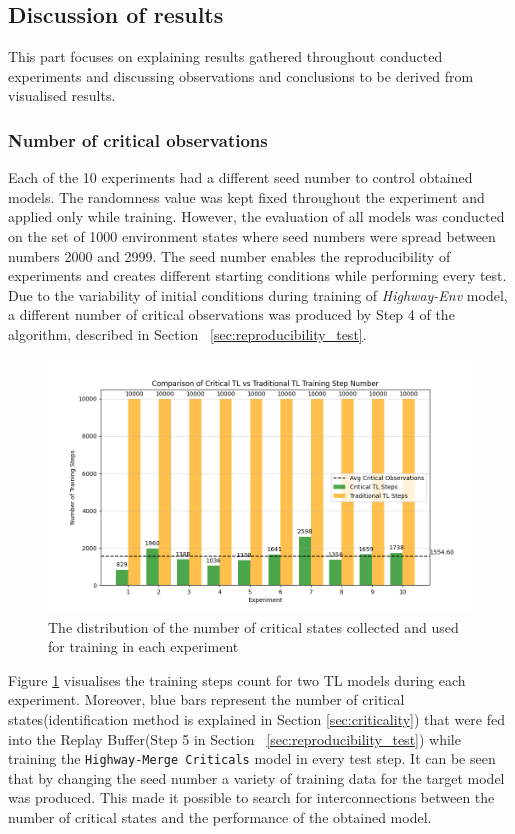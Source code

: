 \subsection{Discussion of results}

This part focuses on explaining results gathered throughout conducted experiments and discussing observations and conclusions to be derived from visualised results.

\subsubsection{Number of critical observations}\label{sec:n_critical_observations}

Each of the 10 experiments had a different seed number to control obtained models. The randomness value was kept fixed throughout the experiment and applied only while training. However, the evaluation of all models was conducted on the set of 1000 environment states where seed numbers were spread between numbers 2000 and 2999. The seed number enables the reproducibility of experiments and creates different starting conditions while performing every test. Due to the variability of initial conditions during training of \emph{Highway-Env} model, a different number of critical observations was produced by Step 4 of the algorithm, described in Section ~\ref{sec:reproducibility_test}. 

\begin{figure}[H]
    \centering
    \includegraphics[width=\textwidth]{images/Crit_obs_count.png}
    \caption{The distribution of the number of critical states collected and used for training in each experiment}
    \label{fig:crit_obs_count}
\end{figure}

Figure \ref{fig:crit_obs_count} visualises the training steps count for two TL models during each experiment. Moreover, blue bars represent the number of critical states(identification method is explained in Section \ref{sec:criticality}) that were fed into the Replay Buffer(Step 5 in Section ~\ref{sec:reproducibility_test}) while training the \texttt{Highway-Merge Criticals} model in every test step. It can be seen that by changing the seed number a variety of training data for the target model was produced. This made it possible to search for interconnections between the number of critical states and the performance of the obtained model.

